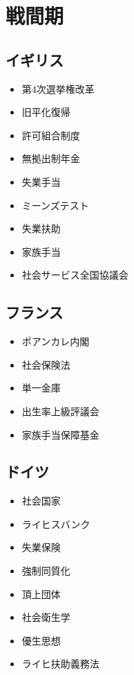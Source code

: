 \documentclass{jsarticle}
\begin{document}
\section{戦間期}

\subsection{イギリス}
\begin{itemize}
	\item 第4次選挙権改革
	\item 旧平化復帰
	\item 許可組合制度
	\item 無拠出制年金
	\item 失業手当
	\item ミーンズテスト
	\item 失業扶助
	\item 家族手当
	\item 社会サービス全国協議会
\end{itemize}

\subsection{フランス}
\begin{itemize}
	\item ポアンカレ内閣
	\item 社会保険法
	\item 単一金庫
	\item 出生率上級評議会
	\item 家族手当保障基金
\end{itemize}

\subsection{ドイツ}
\begin{itemize}
	\item 社会国家
	\item ライヒスバンク
	\item 失業保険
	\item 強制同質化
	\item 頂上団体
	\item 社会衛生学
	\item 優生思想
	\item ライヒ扶助義務法
\end{itemize}
\end{document}
